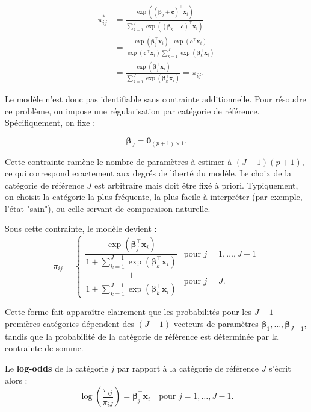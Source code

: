 \documentclass[12pt,a4paper]{article}
\begin{document}
\begin{align}
\pi_{ij}^* &= \frac{\exp((\boldsymbol{\beta}_j + \mathbf{c})^\top \mathbf{x}_i)}{\sum_{k=1}^J \exp((\boldsymbol{\beta}_k + \mathbf{c})^\top \mathbf{x}_i)} \\
&= \frac{\exp(\boldsymbol{\beta}_j^\top \mathbf{x}_i) \cdot \exp(\mathbf{c}^\top \mathbf{x}_i)}{\exp(\mathbf{c}^\top \mathbf{x}_i) \sum_{k=1}^J \exp(\boldsymbol{\beta}_k^\top \mathbf{x}_i)} \\
&= \frac{\exp(\boldsymbol{\beta}_j^\top \mathbf{x}_i)}{\sum_{k=1}^J \exp(\boldsymbol{\beta}_k^\top \mathbf{x}_i)} = \pi_{ij}.
\end{align}

Le modèle n'est donc pas identifiable sans contrainte additionnelle. Pour résoudre ce problème, on impose une régularisation par catégorie de référence. Spécifiquement, on fixe :

\begin{equation}\label{eq:constraint}
\boldsymbol{\beta}_J = \mathbf{0}_{(p+1) \times 1}.
\end{equation}

Cette contrainte ramène le nombre de paramètres à estimer à $(J-1)(p+1)$, ce qui correspond exactement aux degrés de liberté du modèle. Le choix de la catégorie de référence $J$ est arbitraire mais doit être fixé à priori. Typiquement, on choisit la catégorie la plus fréquente, la plus facile à interpréter (par exemple, l'état "sain"), ou celle servant de comparaison naturelle.

Sous cette contrainte, le modèle devient :
\begin{equation}\label{eq:reference-coded}
\pi_{ij} = \begin{cases}
\dfrac{\exp(\boldsymbol{\beta}_j^\top \mathbf{x}_i)}{1 + \sum_{k=1}^{J-1} \exp(\boldsymbol{\beta}_k^\top \mathbf{x}_i)} & \text{pour } j = 1, \ldots, J-1 \\[0.3cm]
\dfrac{1}{1 + \sum_{k=1}^{J-1} \exp(\boldsymbol{\beta}_k^\top \mathbf{x}_i)} & \text{pour } j = J.
\end{cases}
\end{equation}

Cette forme fait apparaître clairement que les probabilités pour les $J-1$ premières catégories dépendent des $(J-1)$ vecteurs de paramètres $\boldsymbol{\beta}_1, \ldots, \boldsymbol{\beta}_{J-1}$, tandis que la probabilité de la catégorie de référence est déterminée par la contrainte de somme.

Le \textbf{log-odds} de la catégorie $j$ par rapport à la catégorie de référence $J$ s'écrit alors :
\begin{equation}\label{eq:logodds}
\log\left(\frac{\pi_{ij}}{\pi_{iJ}}\right) = \boldsymbol{\beta}_j^\top \mathbf{x}_i \quad \text{pour } j = 1, \ldots, J-1.
\end{equation}
\end{document}
